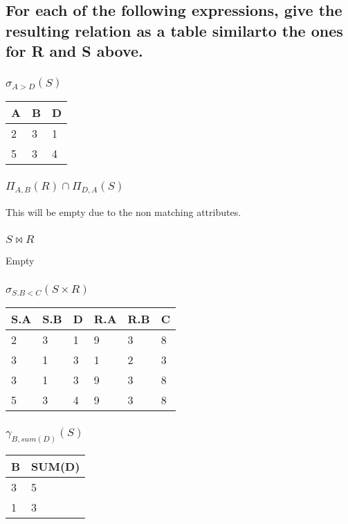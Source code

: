 \documentclass[12pt, a4paper]{article}
\begin{document}
		\subsection{For each of the following expressions, give the resulting relation as a table similarto the ones for R and S above.}
			\subsubsection{$\sigma_{A>D}(S)$}
				\begin{table}[h!]
				\begin{tabular}{|l|l|l|}
				\hline
				A & B & D \\ \hline
				2 & 3 & 1\\ \hline
				5 & 3 & 4\\ \hline
				\end{tabular}
				\end{table}
			\subsubsection{$\Pi_{A,B}(R)\cap \Pi_{D,A}(S)$}
				This will be empty due to the non matching attributes.
			\subsubsection{$S\bowtie R$}
				Empty				
			\subsubsection{$\sigma_{S.B<C}(S\times R)$}
				\begin{table}[h!]
				\begin{tabular}{|l|l|l|l|l|l|}
				\hline
				S.A & S.B & D & R.A & R.B & C \\ \hline
				2 & 3 & 1 & 9 & 3 & 8\\ \hline
				3 & 1 & 3 & 1 & 2 & 3\\ \hline
				3 & 1 & 3 & 9 & 3 & 8\\ \hline
				5 & 3 & 4 & 9 & 3 & 8\\ \hline
				\end{tabular}
				\end{table}
			\clearpage
			\subsubsection{$\gamma_{B,sum(D)}(S)$}
				\begin{table}[h!]
				\begin{tabular}{|l|l|}
				\hline
				B & SUM(D) \\ \hline
				3 & 5\\ \hline
				1 & 3\\ \hline
				\end{tabular}
				\end{table}
\end{document}
